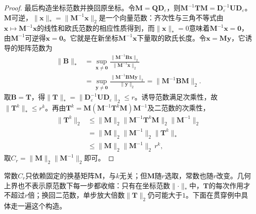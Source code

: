 \begin{proof}
最后构造坐标范数并换回原坐标。令$\bm M=\bm Q\bm D_\varepsilon$，则$\bm M^{-1}\bm T\bm M=\bm D_\varepsilon^{-1}\bm U\bm D_\varepsilon$。$\bm M$可逆，$\lVert\bm x\rVert_*=\lVert\bm M^{-1}\bm x\rVert_2$是一个向量范数：齐次性与三角不等式由$\bm x\mapsto\bm M^{-1}\bm x$的线性和欧氏范数的相应性质得到，而$\lVert\bm x\rVert_*=0$意味着$\bm M^{-1}\bm x=\bm0$，由$\bm M^{-1}$可逆得$\bm x=\bm0$。它就是在新坐标$\bm M^{-1}\bm x$下量取的欧氏长度。令$\bm x=\bm M\bm y$，它诱导的矩阵范数为
\[
\begin{aligned}
 \lVert\bm B\rVert_*
 &=\sup_{\bm x\neq\bm0}\frac{\lVert\bm M^{-1}\bm B\bm x\rVert_2}{\lVert\bm M^{-1}\bm x\rVert_2}\\
 &=\sup_{\bm y\neq\bm0}\frac{\lVert\bm M^{-1}\bm B\bm M\bm y\rVert_2}{\lVert\bm y\rVert_2}
 =\lVert\bm M^{-1}\bm B\bm M\rVert_2 .
\end{aligned}
\]
取$\bm B=\bm T$，得$\lVert\bm T\rVert_*=\lVert\bm D_\varepsilon^{-1}\bm U\bm D_\varepsilon\rVert_2\leq r$。诱导范数满足次乘性，故$\lVert\bm T^k\rVert_*\leq r^k$。再由$\bm T^k=\bm M(\bm M^{-1}\bm T^k\bm M)\bm M^{-1}$及二范数的次乘性，
\[
 \begin{aligned}
 \lVert\bm T^k\rVert_2&\leq\lVert\bm M\rVert_2\lVert\bm M^{-1}\bm T^k\bm M\rVert_2\lVert\bm M^{-1}\rVert_2\\
 &=\lVert\bm M\rVert_2\lVert\bm M^{-1}\rVert_2\lVert\bm T^k\rVert_*\\
 &\leq\lVert\bm M\rVert_2\lVert\bm M^{-1}\rVert_2\,r^k ,
 \end{aligned}
\]
取$C_r=\lVert\bm M\rVert_2\lVert\bm M^{-1}\rVert_2$即可。
\end{proof}
常数$C_r$只依赖固定的换基矩阵$\bm M$，与$k$无关；但$\bm M$随$r$选取，常数也随$r$改变。几何上界也不表示原范数下每一步都收缩：只有在坐标范数$\lVert\cdot\rVert_*$中，$\bm T$的每次作用才不超过$r$倍；换回二范数，单步放大倍数$\lVert\bm T\rVert_2$仍可能大于$1$。下面在贯穿例中具体走一遍这个构造。

